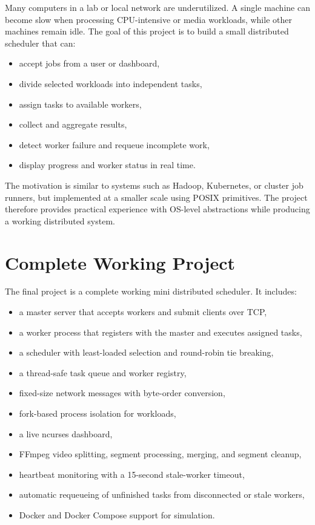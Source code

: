 \documentclass[12pt,a4paper]{article}
\begin{document}
Many computers in a lab or local network are underutilized. A single machine can become slow when processing CPU-intensive or media workloads, while other machines remain idle. The goal of this project is to build a small distributed scheduler that can:

\begin{itemize}[noitemsep]
    \item accept jobs from a user or dashboard,
    \item divide selected workloads into independent tasks,
    \item assign tasks to available workers,
    \item collect and aggregate results,
    \item detect worker failure and requeue incomplete work,
    \item display progress and worker status in real time.
\end{itemize}

The motivation is similar to systems such as Hadoop, Kubernetes, or cluster job runners, but implemented at a smaller scale using POSIX primitives. The project therefore provides practical experience with OS-level abstractions while producing a working distributed system.

\section{Complete Working Project}

The final project is a complete working mini distributed scheduler. It includes:

\begin{itemize}[noitemsep]
    \item a master server that accepts workers and submit clients over TCP,
    \item a worker process that registers with the master and executes assigned tasks,
    \item a scheduler with least-loaded selection and round-robin tie breaking,
    \item a thread-safe task queue and worker registry,
    \item fixed-size network messages with byte-order conversion,
    \item fork-based process isolation for workloads,
    \item a live ncurses dashboard,
    \item FFmpeg video splitting, segment processing, merging, and segment cleanup,
    \item heartbeat monitoring with a 15-second stale-worker timeout,
    \item automatic requeueing of unfinished tasks from disconnected or stale workers,
    \item Docker and Docker Compose support for simulation.
\end{itemize}
\end{document}
